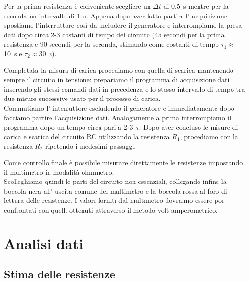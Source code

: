 \documentclass[italian, a4paper, 10pt, twocolumn]{../../style/lab_unige}
\begin{document}
    Per la prima resistenza è conveniente scegliere un $\Delta t$ di 0.5~s mentre per la seconda un intervallo di 1~s. Appena dopo aver fatto partire l’ acquisizione spostiamo l'interruttore così da includere il generatore e interrompiamo la presa dati dopo circa 2-3 costanti di tempo del circuito (45 secondi per la prima resistenza e 90 secondi per la seconda, stimando come costanti di tempo $\tau_1\approx$10~s e $\tau_2\approx$30~s).

    Completata la misura di carica procediamo con quella di scarica mantenendo sempre il circuito in tensione:  prepariamo il programma di acquisizione dati inserendo gli stessi comandi dati in precedenza e lo stesso intervallo di tempo tra due misure successive usato per il processo di carica. \\
    Commutiamo l’ interruttore escludendo il generatore e immediatamente dopo facciamo partire  l’acquisizione dati. Analogamente a prima interrompiamo il programma dopo un tempo circa pari a 2-3~$\tau$.
    Dopo aver concluso le misure di carica e scarica del circuito RC utilizzando la resistenza $R_1$, procediamo con la resistenza $R_2$ ripetendo i medesimi passaggi.

    Come controllo finale è possibile misurare direttamente le resistenze impostando il multimetro in modalità ohmmetro. \\
    Scolleghiamo quindi le parti del circuito non essenziali, collegando infine la boccola nera all’ uscita comune del multimetro e la boccola rossa al foro di lettura delle resistenze. I valori forniti dal multimetro dovranno essere poi confrontati con quelli ottenuti attraverso il metodo volt-amperometrico.


    \section{Analisi dati}
    \label{section:analysis}

    \subsection{Stima delle resistenze}
\end{document}
